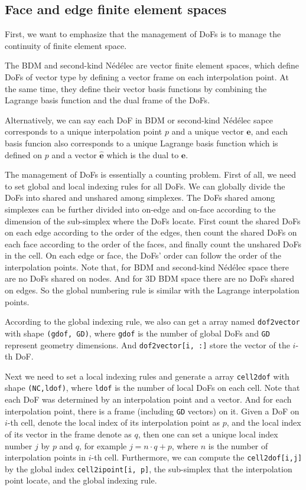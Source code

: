 \documentclass[mathpazo]{cicp}
\begin{document}
\subsection{Face  and edge finite element spaces}

First, we want to emphasize that the management of DoFs is to manage the
continuity of finite element space.  

The BDM and  second-kind N\'ed\'elec are vector finite element spaces, which define DoFs of
vector type by defining a vector frame on each interpolation point.
At the same time, they define their vector basis functions by combining the Lagrange
basis function and the dual frame of the DoFs.

Alternatively, we can say each DoF in BDM or second-kind N\'ed\'elec sapce corresponds to a unique interpolation point
$p$ and a unique vector $\boldsymbol e$, and each basis funcion also corresponds
to a unique Lagrange basis function which is defined on $p$ and a vector
$\hat{\boldsymbol e}$ which is the dual to  $\boldsymbol e$. 

The management of DoFs is essentially a counting problem. First of all, we need
to set global and local indexing rules for all DoFs. 
We can globally divide the DoFs into shared and unshared among simplexes. The
DoFs shared among simplexes can be further divided into on-edge and on-face
according to the dimension of the sub-simplex where the DoFs locate. First count the shared DoFs on
each edge according to the order of the edges, then count the shared DoFs on
each face according to the order of the faces, and finally count the unshared
DoFs in the cell. On each edge or face, the DoFs' order can follow the order of
the interpolation points. Note
that, for BDM and second-kind N\'ed\'elec space there are no DoFs shared on nodes. And for
3D BDM space there are no DoFs shared on edges. So the global numbering rule is
similar with the Lagrange interpolation points. 

According to the global indexing rule, we also can get a array named
\lstinline{dof2vector} with shape \lstinline{(gdof, GD)}, where \lstinline{gdof}
is the number of global DoFs and \lstinline{GD} represent geometry dimensions.
And \lstinline{dof2vector[i, :]} store the vector of the $i$-th DoF.

Next we need to set a local indexing rules and generate a array
\lstinline{cell2dof} with shape \lstinline{(NC,ldof)}, where \lstinline{ldof}
is the number of local DoFs on each cell. Note that each DoF was determined by an
interpolation point and a vector. And for each interpolation point, there is a frame
(including \lstinline{GD} vectors) on it. Given a DoF on $i$-th cell, denote the
local index  of its interpolation point as $p$, and the local index 
of its vector in the frame denote as $q$, then one can set a unique local index
number $j$ by $p$ and $q$, for example
$j = n\cdot q + p$,
where $n$ is the number of interpolation points in $i$-th cell.  Furthermore, 
we can compute the \lstinline{cell2dof[i,j]} by the global index 
\lstinline{cell2ipoint[i, p]}, the sub-simplex that the interpolation point
locate, and the global indexing rule. 
\end{document}
